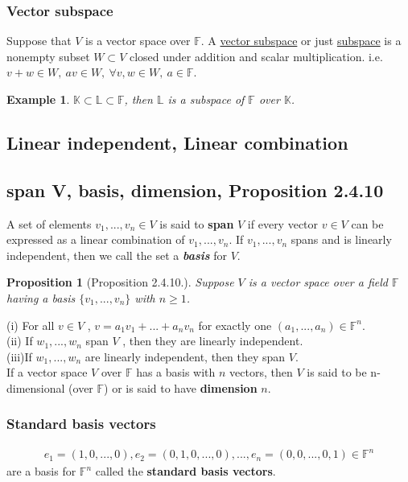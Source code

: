 \documentclass[11pt,a4paper]{article}
\newtheorem{proposition}{Proposition}
\newtheorem{example}{Example}
\begin{document}
\subsubsection{ Vector subspace}
Suppose that $V$ is a vector space over $\mathbb{F}$. A \underline{vector subspace} or just \underline{subspace} is a nonempty subset $W\subset V$ closed under addition and scalar multiplication. i.e. $v+w\in W,\ av\in W,\ \forall v,w\in W,\ a\in \mathbb{F}$.\\
\begin{example}
$\mathbb{K}\subset \mathbb{L}\subset \mathbb{F}$, then $\mathbb{L}$ is a subspace of $\mathbb{F}$ over $\mathbb{K}$.
\end{example}
\subsection{Linear independent, Linear combination}
\subsection{span V, basis, dimension, Proposition 2.4.10}
A set of elements $v_1,...,v_n\in V$ is said to \textbf{span} $V$ if every vector $v\in V$ can be expressed as a linear combination of $v_1,...,v_n$. If $v_1,...,v_n$ spans and is linearly independent, then we call the set a \textbf{\textit{basis}} for $V$.
\begin{proposition}[Proposition 2.4.10.]
    Suppose $V$ is a vector space over a field $\mathbb{F}$ having a basis $\{v_1,...,v_n\}$ with $n \geq 1$.
\end{proposition}
(i) For all $v \in V$ , $v = a_1 v_1 + ... + a_n v_n$ for exactly one $(a_1,...,a_n)\in \mathbb{F}^n$.\\
(ii) If $w_1,...,w_n$ span $V$ , then they are linearly independent.\\
(iii)If $w_1,...,w_n$ are linearly independent, then they span $V$.\\
If a vector space $V$ over $\mathbb{F}$ has a basis with $n$ vectors, then $V$ is said to be n-dimensional (over $\mathbb{F}$) or is said to have \textbf{dimension} $n$.
\subsubsection{Standard basis vectors}
\begin{equation}
    \begin{aligned}
        e_1=(1,0,...,0),e_2=(0,1,0,...,0),...,e_n=(0,0,...,0,1)\in \mathbb{F}^n
    \end{aligned}
    \nonumber
\end{equation}
are a basis for $\mathbb{F}^n$ called the \textbf{standard basis vectors}.
\end{document}
